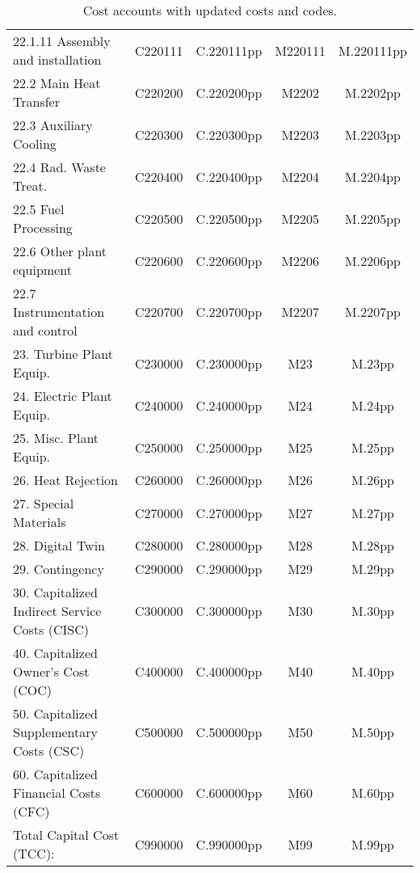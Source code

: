 \begin{table}[h!]
{\begin{tabular}{lcccc}
\hspace{15mm}22.1.11 Assembly and installation & C220111 & C.220111pp & M220111 & M.220111pp \\
\hspace{10mm}22.2 Main Heat Transfer & C220200 & C.220200pp & M2202 & M.2202pp \\
\hspace{10mm}22.3 Auxiliary Cooling & C220300 & C.220300pp & M2203 & M.2203pp \\
\hspace{10mm}22.4 Rad. Waste Treat. & C220400 & C.220400pp & M2204 & M.2204pp \\
\hspace{10mm}22.5 Fuel Processing & C220500 & C.220500pp & M2205 & M.2205pp \\
\hspace{10mm}22.6 Other plant equipment & C220600 & C.220600pp & M2206 & M.2206pp \\
\hspace{10mm}22.7 Instrumentation and control & C220700 & C.220700pp & M2207 & M.2207pp \\
\hspace{5mm}23. Turbine Plant Equip. & C230000 & C.230000pp & M23 & M.23pp \\
\hspace{5mm}24. Electric Plant Equip. & C240000 & C.240000pp & M24 & M.24pp \\
\hspace{5mm}25. Misc. Plant Equip. & C250000 & C.250000pp & M25 & M.25pp \\
\hspace{5mm}26. Heat Rejection & C260000 & C.260000pp & M26 & M.26pp \\
\hspace{5mm}27. Special Materials & C270000 & C.270000pp & M27 & M.27pp \\
\hspace{5mm}28. Digital Twin & C280000 & C.280000pp & M28 & M.28pp \\
\hspace{5mm}29. Contingency & C290000 & C.290000pp & M29 & M.29pp \\
30. Capitalized Indirect Service Costs (CISC) & C300000 & C.300000pp & M30 & M.30pp \\
40. Capitalized Owner’s Cost (COC) & C400000 & C.400000pp & M40 & M.40pp \\
50. Capitalized Supplementary Costs (CSC) & C500000 & C.500000pp & M50 & M.50pp \\
60. Capitalized Financial Costs (CFC) & C600000 & C.600000pp & M60 & M.60pp \\
\hline
Total Capital Cost (TCC): & C990000 & C.990000pp & M99 & M.99pp \\
\hline
\end{tabular}
}
\caption{Cost accounts with updated costs and codes. }
\label{tab:costsupdatedcodes}
\end{table}


